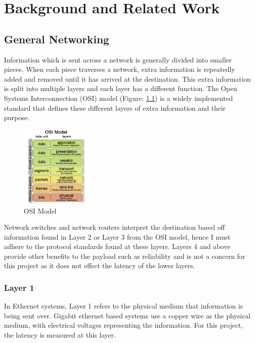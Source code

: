 \chapter{Background and Related Work}\label{C:back}

\section{General Networking}

Information which is sent across a network is generally divided into smaller pieces. When each piece
traverses a network, extra information is repeatedly added and removed until it has arrived at the
destination. This extra information is split into multiple layers and each layer has a different function.
The Open Systems Interconnection (OSI) model (Figure: \ref{fig:OSIModel}) is a widely implemented standard that
defines these different layers of extra information and their purpose.

\begin{figure}[H]
    \begin{center}
        \includegraphics[height=4cm,keepaspectratio]{Images/OSIModel.png}
        \caption{OSI Model \cite{OSIPic}}
        \label{fig:OSIModel}
    \end{center}
\end{figure}

Network switches and network routers interpret the destination based off information found in
Layer 2 or Layer 3 from the OSI model, hence I must adhere to the protocol standards found at these
layers. Layers 4 and above provide other benefits to the payload such as reliability and is not a
concern for this project as it does not effect the latency of the lower layers.

\subsection{Layer 1}

In Ethernet systems, Layer 1 refers to the physical medium that information is being sent over.
Gigabit ethernet based systems use a copper wire as the physical medium, with electrical voltages
representing the information. For this project, the latency is measured at this layer.

